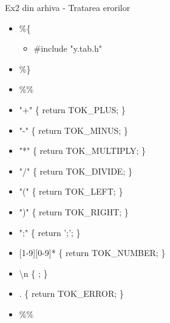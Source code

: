 \documentclass[pdf]{beamer}
\begin{document}
\begin{frame}{Ex2 din arhiva - Tratarea erorilor}
\begin{itemize}
	\item[]
	\%\{
	
	\begin{itemize}
		\item[]
		\#include "y.tab.h"
	\end{itemize}
	
	\item[]
	\%\}
		\linebreak

	\item[]
	\%\%

	\item[]
	"+" \hspace{1.55cm} \{ return TOK\_PLUS; \}

	\item[]
	"-" \hspace{1.7cm} \{ return TOK\_MINUS; \}

	\item[]
	"*" \hspace{1.65cm} \{ return TOK\_MULTIPLY; \}

	\item[]
	"/" \hspace{1.65cm} \{ return TOK\_DIVIDE; \}

	\item[]
	"(" \hspace{1.65cm} \{ return TOK\_LEFT; \}

	\item[]
	")" \hspace{1.65cm} \{ return TOK\_RIGHT; \}

	\item[]
	";" \hspace{1.7cm} \{ return ';'; \}

	\item[]
	{[1-9][0-9]}* \hspace{0.5cm} \{ return TOK\_NUMBER; \}

	\item[]
	\textbackslash n \hspace{1.9cm}\{ ; \}

	\item[]
	. \hspace{2cm} \{ return TOK\_ERROR; \}

	\item[]
	\%\%
\end{itemize}
\end{frame}
\end{document}
